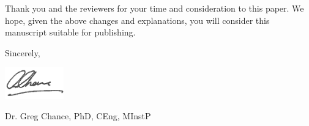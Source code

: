 \documentclass[11pt, a4paper]{letter} %
\begin{document}
\begin{letter}
\bigskip

Thank you and the reviewers for your time and consideration to this paper. We hope, given the above changes and explanations, you will consider this manuscript suitable for publishing. 

\bigskip

Sincerely,

\bigskip

\includegraphics[width=1in]{signature.png}

Dr. Greg Chance, PhD, CEng, MInstP

\end{letter}
\end{document}
